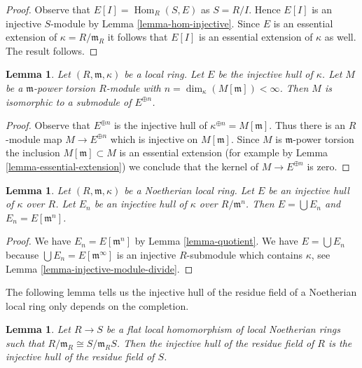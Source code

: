 \documentclass{stacks-project}
\theoremstyle{plain}
\newtheorem{lemma}[subsection]{Lemma}
\theoremstyle{definition}
\theoremstyle{remark}
\numberwithin{equation}{subsection}
\def\Hom{\mathop{\mathrm{Hom}}\nolimits}
\begin{document}
\begin{proof}
Observe that $E[I] = \Hom_R(S, E)$ as $S = R/I$. Hence $E[I]$ is an injective
$S$-module by Lemma \ref{lemma-hom-injective}. Since $E$ is an essential
extension of $\kappa = R/\mathfrak m_R$ it follows that $E[I]$ is an
essential extension of $\kappa$ as well. The result follows.
\end{proof}

\begin{lemma}
\label{lemma-torsion-submodule-sum-injective-hulls}
Let $(R, \mathfrak m, \kappa)$ be a local ring.
Let $E$ be the injective hull of $\kappa$.
Let $M$ be a $\mathfrak m$-power torsion $R$-module
with $n = \dim_\kappa(M[\mathfrak m]) < \infty$.
Then $M$ is isomorphic to a submodule of $E^{\oplus n}$.
\end{lemma}

\begin{proof}
Observe that $E^{\oplus n}$ is the injective hull of
$\kappa^{\oplus n} = M[\mathfrak m]$. Thus there is an $R$-module map
$M \to E^{\oplus n}$ which is injective on $M[\mathfrak m]$.
Since $M$ is $\mathfrak m$-power torsion the inclusion
$M[\mathfrak m] \subset M$ is an essential extension
(for example by Lemma \ref{lemma-essential-extension})
we conclude that the kernel of $M \to E^{\oplus n}$ is zero.
\end{proof}

\begin{lemma}
\label{lemma-union-artinian}
Let $(R, \mathfrak m, \kappa)$ be a Noetherian local ring.
Let $E$ be an injective hull of $\kappa$ over $R$.
Let $E_n$ be an injective hull of $\kappa$ over $R/\mathfrak m^n$.
Then $E = \bigcup E_n$ and $E_n = E[\mathfrak m^n]$.
\end{lemma}

\begin{proof}
We have $E_n = E[\mathfrak m^n]$ by Lemma \ref{lemma-quotient}.
We have $E = \bigcup E_n$ because $\bigcup E_n = E[\mathfrak m^\infty]$
is an injective $R$-submodule which contains $\kappa$, see
Lemma \ref{lemma-injective-module-divide}.
\end{proof}

\noindent
The following lemma tells us the injective hull of the residue
field of a Noetherian local ring only depends on the completion.

\begin{lemma}
\label{lemma-compare}
Let $R \to S$ be a flat local homomorphism of local Noetherian rings
such that $R/\mathfrak m_R \cong S/\mathfrak m_R S$.
Then the injective hull of the residue field
of $R$ is the injective hull of the residue field of $S$.
\end{lemma}
\end{document}
